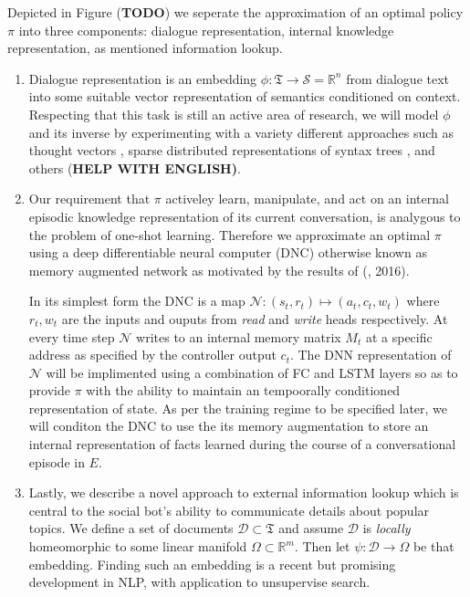 \documentclass{article} %
\numberwithin{equation}{subsection}
\numberwithin{theorem}{subsection}
\theoremstyle{named}
\def\scriptd{{\mathcal D}}
\def\scriptn{{\mathcal N}}
\def\scripts{{\mathcal S}}
\begin{document}
Depicted in Figure (\textbf{TODO}) we seperate the approximation of an optimal policy $\pi$ into three components: dialogue representation, internal knowledge representation, as mentioned information lookup.
\begin{enumerate}
\item Dialogue representation is an embedding $\phi: \mathfrak{T} \to \scripts = \mathbb{R}^n$ from dialogue text into some suitable vector representation of semantics conditioned on context. Respecting that this task is still an active area of research, we will model $\phi$ and its inverse by experimenting with a variety different approaches such as thought vectors \cite{NIPS2015_5950}, sparse distributed representations of syntax trees \cite{DBLP:journals/corr/YogatamaFDS14}, and others (\textbf{HELP WITH ENGLISH)}.

\item Our requirement that $\pi$ activeley learn, manipulate, and act on an internal episodic knowledge representation of its current conversation, is analygous to the problem of one-shot learning. Therefore we approximate an optimal $\pi$ using a deep differentiable neural computer (DNC)\cite{graves2016hybrid}\cite{DBLP:journals/corr/GravesWD14} otherwise known as memory augmented network as motivated by the results of (\citeauthor{DBLP:journals/corr/SantoroBBWL16}, 2016).

In its simplest form the DNC is a map $\scriptn: (s_t, r_t) \mapsto (a_t, c_t, w_t)$ where  $r_t, w_t$ are the inputs and ouputs from \emph{read} and \emph{write} heads respectively. At every time step $\scriptn$ writes to an internal memory matrix $M_t$ at a specific address as specified by the controller output $c_t$. The DNN representation of $\scriptn$ will be implimented using a combination of FC and LSTM layers so as to provide $\pi$ with the ability to maintain an tempoorally conditioned representation of state. As per the training regime to be specified later, we will conditon the DNC to use the its memory augmentation to store an internal representation of facts learned during the course of a conversational episode in $E$.


\item Lastly, we describe a novel approach to external information lookup which is central to the social bot's ability to communicate details about popular topics. We define a set of documents $\scriptd \subset \mathfrak{T}$ and assume $\scriptd$ is \emph{locally} homeomorphic to some linear manifold $\Omega \subset \mathbb{R}^m$. Then let $\psi: \scriptd \to \Omega$ be that embedding. Finding such an embedding is a recent but promising development in NLP, with application to unsupervise search\cite{DBLP:journals/corr/DaiOL15}.


\end{enumerate}
\end{document}
